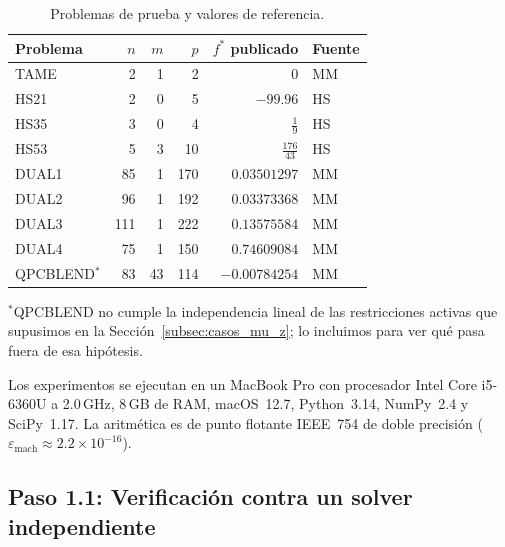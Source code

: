 \begin{table}[H]
\centering
\caption{Problemas de prueba y valores de referencia.}
\label{tab:benchmark_problems}
\begin{tabular}{lrrr r l}
\toprule
Problema & $n$ & $m$ & $p$ & $f^*$ publicado & Fuente \\
\midrule
TAME     &   2 &  1 &   2 &  $0$             & MM \\
HS21     &   2 &  0 &   5 & $-99.96$        & HS \\
HS35     &   3 &  0 &   4 &  $\frac{1}{9}$          & HS \\[3pt]
HS53     &   5 &  3 &  10 &  $\frac{176}{43}$       & HS \\
DUAL1    &  85 &  1 & 170 &  $0.03501297$   & MM \\
DUAL2    &  96 &  1 & 192 &  $0.03373368$   & MM \\
DUAL3    & 111 &  1 & 222 &  $0.13575584$   & MM \\
DUAL4    &  75 &  1 & 150 &  $0.74609084$   & MM \\
QPCBLEND$^{*}$ &  83 & 43 & 114 & $-0.00784254$   & MM \\
\bottomrule
\end{tabular}

\vspace{0.3em}
\footnotesize
$^{*}$QPCBLEND no cumple la independencia lineal de las restricciones activas que supusimos en la Sección~\ref{subsec:casos_mu_z}; lo incluimos para ver qué pasa fuera de esa hipótesis.
\end{table}


Los experimentos se ejecutan en un MacBook Pro con procesador Intel Core i5-6360U a 2.0\,GHz, 8\,GB de RAM, macOS~12.7, Python~3.14, NumPy~2.4 y SciPy~1.17. La aritmética es de punto flotante IEEE~754 de doble precisión ($\varepsilon_{\text{mach}} \approx 2.2 \times 10^{-16}$).

\subsection*{Paso 1.1: Verificación contra un solver independiente}


